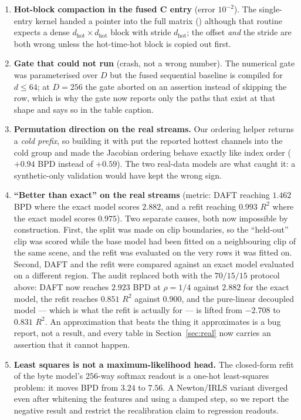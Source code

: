 \documentclass[11pt]{article}
\theoremstyle{definition}
\newcommand{\code}[1]{\texttt{\detokenize{#1}}}
\begin{document}
\begin{enumerate}[leftmargin=1.4em]
\item \textbf{Hot-block compaction in the fused C entry} (error $10^{-2}$). The single-entry kernel handed
      \code{hot_recur} a pointer into the full matrix (\code{Uf + n_cold}) although that routine expects a
      dense $d_{\text{hot}}\times d_{\text{hot}}$ block with stride $d_{\text{hot}}$; the offset \emph{and}
      the stride are both wrong unless the hot-time-hot block is copied out first.
\item \textbf{Gate that could not run} (crash, not a wrong number). The numerical gate was parameterised over
      $D$ but the fused sequential baseline is compiled for $d\le64$; at $D=256$ the gate aborted on an
      assertion instead of skipping the row, which is why the gate now reports only the paths that exist at
      that shape and says so in the table caption.
\item \textbf{Permutation direction on the real streams.} Our ordering helper returns a \emph{cold prefix}, so
      building it with \code{argsort(..., descending=True)} put the reported hottest channels into the cold
      group and made the Jacobian ordering behave exactly like index order ($+0.94$ BPD instead of $+0.59$).
      The two real-data models are what caught it: a synthetic-only validation would have kept the wrong sign.
\item \textbf{``Better than exact'' on the real streams} (metric: DAFT reaching $1.462$ BPD where the
      exact model scores $2.882$, and a refit reaching $0.993$ $R^2$ where the exact model scores
      $0.975$). Two separate causes, both now impossible by construction. First, the split was made on
      clip boundaries, so the ``held-out'' clip was scored while the base model had been fitted on a
      neighbouring clip of the same scene, and the refit was evaluated on the very rows it was fitted
      on. Second, DAFT and the refit were compared against an exact model evaluated on a different
      region. The audit replaced both with the $70/15/15$ protocol above: DAFT now reaches $2.923$ BPD
      at $\rho=1/4$ against $2.882$ for the exact model, the refit reaches $0.851$ $R^2$ against
      $0.900$, and the pure-linear decoupled model --- which is what the refit is actually for --- is
      lifted from $-2.708$ to $0.831$ $R^2$. An approximation that beats the thing it approximates is a
      bug report, not a result, and every table in Section~\ref{sec:real} now carries an assertion that
      it cannot happen.
\item \textbf{Least squares is not a maximum-likelihood head.} The closed-form refit of the byte model's
      $256$-way softmax readout is a one-hot least-squares problem: it moves BPD from $3.24$ to $7.56$. A
      Newton/IRLS variant diverged even after whitening the features and using a damped step, so we report the
      negative result and restrict the recalibration claim to regression readouts.
\end{enumerate}
\end{document}
